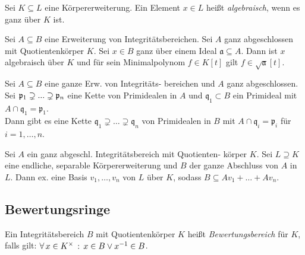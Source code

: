 \documentclass{cheat-sheet}
\newcommand{\aaa}{\mathfrak{a}}
\newcommand{\ppp}{\mathfrak{p}}
\newcommand{\qqq}{\mathfrak{q}}
\begin{document}
\begin{defn}
  Sei $K \subseteq L$ eine Körpererweiterung.
  Ein Element $x \in L$ heißt \emph{algebraisch}, wenn es ganz über $K$ ist.
\end{defn}

\begin{prop}
  Sei $A \subseteq B$ eine Erweiterung von Integritätsbereichen.
  Sei $A$ ganz abgeschlossen mit Quotientenkörper $K$.
  Sei $x \in B$ ganz über einem Ideal $\aaa \subseteq A$.
  Dann ist $x$ algebraisch über $K$ und für sein Minimalpolynom $f \in K[t]$ gilt $f \in \sqrt{\aaa}[t]$.
\end{prop}



\begin{satz}
  Sei $A \subseteq B$ eine ganze Erw. von Integritäts- bereichen und $A$ ganz abgeschlossen.
  Sei $\ppp_1 \supsetneq \nldots \supsetneq \ppp_n$ eine Kette von Primidealen in $A$ und $\qqq_1 \subset B$ ein Primideal mit $A \cap \qqq_1 = \ppp_1$. \\
  Dann gibt es eine Kette $\qqq_1 \supsetneq \ldots \supsetneq \qqq_n$ von Primidealen in $B$ mit $A \cap \qqq_i = \ppp_i$ für $i = 1, \ldots, n$.
\end{satz}

\begin{prop}
  Sei $A$ ein ganz abgeschl. Integritätsbereich mit Quotienten- körper $K$.
  Sei $L \supseteq K$ eine endliche, separable Körpererweiterung und $B$ der ganze Abschluss von $A$ in $L$.
  Dann ex. eine Basis $v_1, \ldots, v_n$ von $L$ über $K$, sodass $B \subseteq A v_1 + \ldots + A v_n$.
\end{prop}


\subsection{Bewertungsringe}


\begin{defn}
  Ein Integritätsbereich $B$ mit Quotientenkörper $K$ heißt \emph{Bewertungsbereich} für $K$, falls gilt: $\forall \, {x \in K^{\times}} \,:\, x \in B \vee x^{-1} \in B$.
\end{defn}
\end{document}
